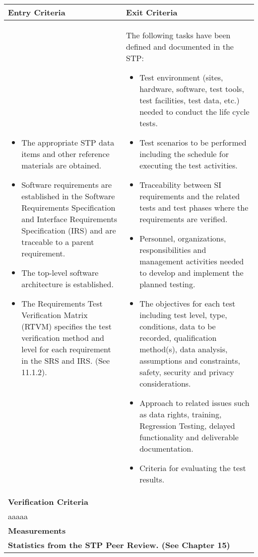 \documentclass{book}
\begin{document}
\begin{table}[h]
	\centering
	\setlength{\leftmargini}{0.5cm}
	\begin{tabular}{| m{8cm} | m{8cm} |}
		\hline
		\textbf{\textbf{Entry Criteria}} & \textbf{Exit Criteria}\\
		\hline
		\begin{itemize}
			\item The appropriate STP data items and
			other reference materials are obtained.
			\item Software requirements are established
			in the Software Requirements
			Specification and Interface
			Requirements Specification (IRS) and
			are traceable to a parent requirement.
			\item The top-level software architecture is
			established.
			\item The Requirements Test Verification
			Matrix (RTVM) specifies the test
			verification method and level for each
			requirement in the SRS and IRS. (See
			11.1.2).
		\end{itemize} &
		The following tasks have been defined and documented in the STP:
		\begin{itemize}
			\item Test environment (sites, hardware, software, test tools, test facilities,
			test data, etc.) needed to conduct the life cycle tests.
			\item Test scenarios to be performed including the schedule for executing
			the test activities.
			\item Traceability between SI requirements and the related tests and test
			phases where the requirements are verified.
			\item Personnel, organizations, responsibilities and management activities
			needed to develop and implement the planned testing.
			\item The objectives for each test including test level, type, conditions, data
			to be recorded, qualification method(s), data analysis, assumptions and
			constraints, safety, security and privacy considerations.
			\item Approach to related issues such as data rights, training, Regression
			Testing, delayed functionality and deliverable documentation.
			\item Criteria for evaluating the test results.
		\end{itemize} \\
		\hline
		\multicolumn{2}{|l|}{\textbf{Verification Criteria}}\\
		\hline
		\multicolumn{2}{|l|}{aaaaa}\\
		\hline
		\multicolumn{2}{|l|}{\textbf{Measurements}}\\
		\hline
		\multicolumn{2}{|l|}{\textbf{Statistics from the STP Peer Review. (See Chapter 15)}}\\
		\hline
	\end{tabular}
\end{table}
	
	
\end{document}
